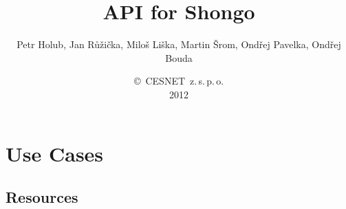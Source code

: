 \documentclass[a4paper]{report}
\begin{document}
\title{API for Shongo}
\author{Petr Holub, Jan Růžička, Miloš Liška, Martin Šrom, Ondřej Pavelka, Ondřej Bouda}
\date{\copyright~CESNET~z.\,s.\,p.\,o.\\2012}

\maketitle

\tableofcontents

\chapter{Use Cases}

\section{Resources}
\end{document}
